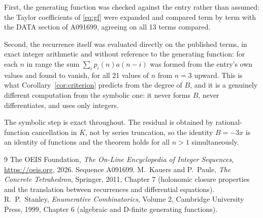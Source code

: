 \documentclass[11pt,a4paper]{article}
\theoremstyle{plain}
\theoremstyle{definition}
\begin{document}
First, the generating function was checked against the entry rather than assumed: the
Taylor coefficients of \eqref{eq:gf} were expanded and compared term by term with the DATA
section of A091699, agreeing on all 13 terms compared.

Second, the recurrence itself was evaluated directly on the published terms, in exact
integer arithmetic and without reference to the generating function: for each $n$ in range
the sum $\sum_{i}p_{i}(n)a(n-i)$ was formed from the entry's own values and found to
vanish, for all 21 values of $n$ from $n=3$ upward. This is what
Corollary~\ref{cor:criterion} predicts from the degree of $B$, and it is a genuinely
different computation from the symbolic one: it never forms $B$, never differentiates, and
uses only integers.

The symbolic step is exact throughout. The residual is obtained by rational-function
cancellation in $K$, not by series truncation, so the identity $B=- 3 x$ is an
identity of functions and the theorem holds for all $n>1$ simultaneously.

\begin{thebibliography}{9}
 The OEIS Foundation, \emph{The On-Line Encyclopedia of Integer Sequences},
\url{https://oeis.org}, 2026. Sequence A091699.
 M.~Kauers and P.~Paule, \emph{The Concrete Tetrahedron}, Springer, 2011,
Chapter 7 (holonomic closure properties and the translation between recurrences and
differential equations).
 R.~P.~Stanley, \emph{Enumerative Combinatorics}, Volume 2, Cambridge
University Press, 1999, Chapter 6 (algebraic and D-finite generating functions).
\end{thebibliography}
\end{document}
